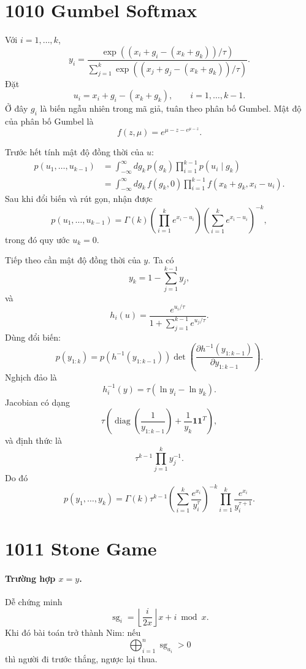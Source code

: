 \documentclass[11pt]{article}
\begin{document}
\section{1010 Gumbel Softmax}

Với $i=1,\ldots,k$,
\[
  y_i=
  \frac{\exp\left((x_i+g_i-(x_k+g_k))/\tau\right)}
       {\sum_{j=1}^{k}\exp\left((x_j+g_j-(x_k+g_k))/\tau\right)}.
\]
Đặt
\[
  u_i=x_i+g_i-(x_k+g_k),\qquad i=1,\ldots,k-1.
\]
Ở đây $g_i$ là biến ngẫu nhiên trong mã giả, tuân theo phân bố Gumbel. Mật
độ của phân bố Gumbel là
\[
  f(z,\mu)=e^{\mu-z-e^{\mu-z}}.
\]

Trước hết tính mật độ đồng thời của $u$:
\[
\begin{aligned}
  p(u_1,\ldots,u_{k-1})
  &=
  \int_{-\infty}^{\infty}
  dg_k\,p(g_k)\prod_{i=1}^{k-1}p(u_i\mid g_k)\\
  &=
  \int_{-\infty}^{\infty}
  dg_k\,f(g_k,0)\prod_{i=1}^{k-1}f(x_k+g_k,x_i-u_i).
\end{aligned}
\]
Sau khi đổi biến và rút gọn, nhận được
\[
  p(u_1,\ldots,u_{k-1})
  =
  \Gamma(k)
  \left(\prod_{i=1}^{k}e^{x_i-u_i}\right)
  \left(\sum_{i=1}^{k}e^{x_i-u_i}\right)^{-k},
\]
trong đó quy ước $u_k=0$.

Tiếp theo cần mật độ đồng thời của $y$. Ta có
\[
  y_k=1-\sum_{j=1}^{k-1}y_j,
\]
và
\[
  h_i(u)=
  \frac{e^{u_i/\tau}}{1+\sum_{j=1}^{k-1}e^{u_j/\tau}}.
\]
Dùng đổi biến:
\[
  p(y_{1:k})
  =
  p(h^{-1}(y_{1:k-1}))
  \det\left(
    \frac{\partial h^{-1}(y_{1:k-1})}{\partial y_{1:k-1}}
  \right).
\]
Nghịch đảo là
\[
  h^{-1}_i(y)=\tau(\ln y_i-\ln y_k).
\]
Jacobian có dạng
\[
  \tau\left(\operatorname{diag}\left(\frac1{y_{1:k-1}}\right)
  +\frac1{y_k}\mathbf{1}\mathbf{1}^T\right),
\]
và định thức là
\[
  \tau^{k-1}\prod_{j=1}^{k} y_j^{-1}.
\]
Do đó
\[
  p(y_1,\ldots,y_k)
  =
  \Gamma(k)\tau^{k-1}
  \left(\sum_{i=1}^{k}\frac{e^{x_i}}{y_i^\tau}\right)^{-k}
  \prod_{i=1}^{k}\frac{e^{x_i}}{y_i^{\tau+1}}.
\]

\section{1011 Stone Game}

\paragraph{Trường hợp $x=y$.}
Dễ chứng minh
\[
  \operatorname{sg}_i=\left\lfloor\frac{i}{2x}\right\rfloor x+i\bmod x.
\]
Khi đó bài toán trở thành Nim: nếu
\[
  \bigoplus_{i=1}^{n}\operatorname{sg}_{a_i}>0
\]
thì người đi trước thắng, ngược lại thua.
\end{document}
